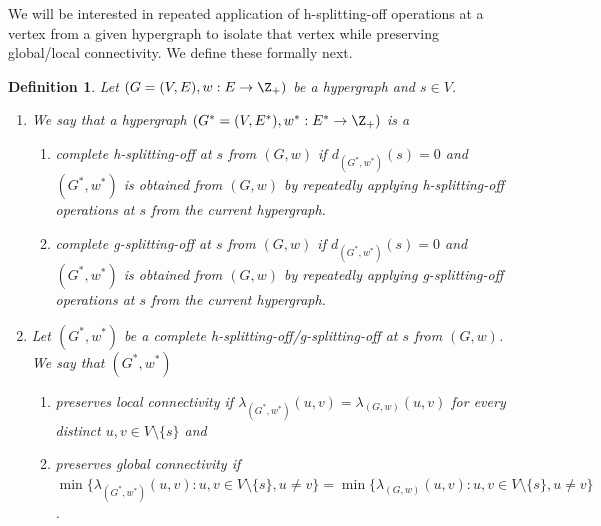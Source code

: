 \documentclass{article}
\newtheorem{definition}{Definition}[section]
\begin{document}
We will be interested in repeated application of h-splitting-off operations at a vertex from a given hypergraph to isolate that vertex while preserving global/local connectivity. We define these formally next. 
\begin{definition}
    Let $(G=(V, E), w: E\rightarrow \Z_+)$ be a hypergraph and $s\in V$. 
    \begin{enumerate}
        \item We say that a hypergraph $(G^*=(V, E^*), w^*: E^*\rightarrow \Z_+)$ is a 
        \begin{enumerate}
            \item \emph{complete h-splitting-off at $s$ from $(G, w)$} if $d_{(G^*, w^*)}(s) = 0$ and $(G^*, w^*)$ is obtained from $(G, w)$ by repeatedly applying h-splitting-off operations at $s$ from the current hypergraph. 
            \item \emph{complete g-splitting-off at $s$ from $(G, w)$} if $d_{(G^*, w^*)}(s) = 0$ and $(G^*, w^*)$ is obtained from $(G, w)$ by repeatedly applying g-splitting-off operations at $s$ from the current hypergraph. 
        \end{enumerate}

        \item Let $(G^*, w^*)$ be a complete h-splitting-off/g-splitting-off at $s$ from $(G, w)$. We say that $(G^*, w^*)$ 
        \begin{enumerate}
            \item 
            preserves local connectivity if $\lambda_{(G^*, w^*)}(u, v)=\lambda_{(G, w)}(u, v)$ for every distinct $u, v\in V\setminus\{s\}$ and 
            
            \item preserves global connectivity if \\
            $\min\{\lambda_{(G^*, w^*)}(u, v): u, v\in V\setminus \{s\}, u \neq v\}=\min\{\lambda_{(G, w)}(u, v): u, v\in V\setminus \{s\}, u \neq v\}$. 
            
        \end{enumerate}
    \end{enumerate}
\end{definition}
\end{document}
